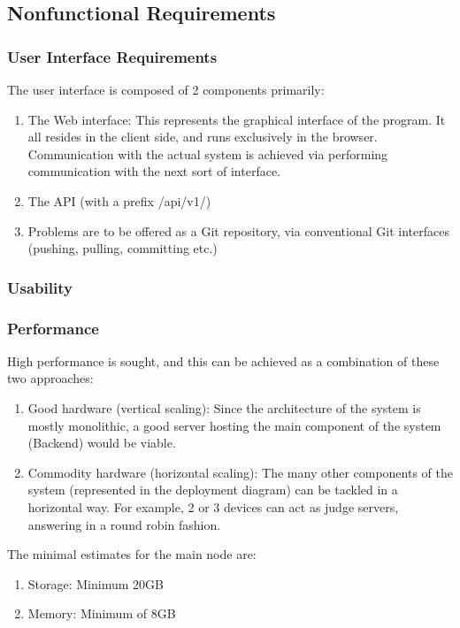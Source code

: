 \subsection{Non\-functional Requirements}
\subsubsection{User Interface Requirements}

The user interface is composed of 2 components primarily:
\begin{enumerate}
    \item The Web interface: This represents the graphical interface of the program. It all resides in the client side, and runs exclusively in the browser. Communication with the actual system is achieved via performing communication with the next sort of interface.
    \item The API (with a prefix /api/v1/)
    \item Problems are to be offered as a Git repository, via conventional Git interfaces (pushing, pulling, committing etc.)
\end{enumerate}

\subsubsection{Usability}
\subsubsection{Performance}

High performance is sought, and this can be achieved as a combination of these two approaches:

\begin{enumerate}
    \item Good hardware (vertical scaling): Since the architecture of the system is mostly monolithic, a good server hosting the main component of the system (Backend) would be viable.
    \item Commodity hardware (horizontal scaling): The many other components of the system (represented in the deployment diagram) can be tackled in a horizontal way. For example, 2 or 3 devices can act as judge servers, answering in a round robin fashion.
\end{enumerate}


The minimal estimates for the main node are:
\begin{enumerate}
    \item Storage: Minimum 20GB
    \item Memory: Minimum of 8GB
\end{enumerate}


